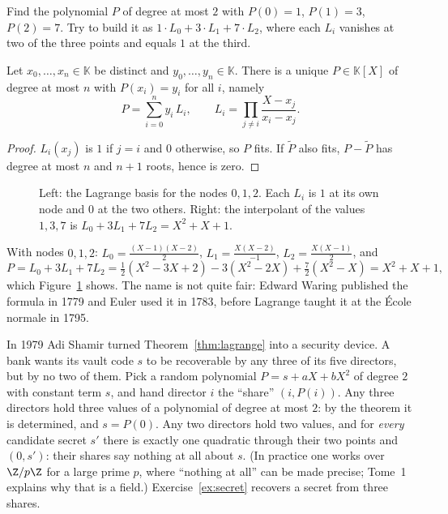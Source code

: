 \begin{think}
Find the polynomial $P$ of degree at most $2$ with $P(0)=1$, $P(1)=3$, $P(2)=7$. Try to build it as $1\cdot L_0+3\cdot L_1+7\cdot L_2$, where each $L_i$ vanishes at two of the three points and equals $1$ at the third.
\end{think}

\begin{theorem}[Lagrange]\label{thm:lagrange}
Let $x_0,\dots,x_n\in\mathbb K$ be distinct and $y_0,\dots,y_n\in\mathbb K$. There is a unique $P\in\mathbb K[X]$ of degree at most $n$ with $P(x_i)=y_i$ for all $i$, namely
\[
P=\sum_{i=0}^ny_i\,L_i,\qquad L_i=\prod_{j\ne i}\frac{X-x_j}{x_i-x_j}.
\]
\end{theorem}
\begin{proof}
$L_i(x_j)$ is $1$ if $j=i$ and $0$ otherwise, so $P$ fits. If $\tilde P$ also fits, $P-\tilde P$ has degree at most $n$ and $n+1$ roots, hence is zero.
\end{proof}

\begin{figure}[ht]
\centering
{}
\caption{Left: the Lagrange basis for the nodes $0,1,2$. Each $L_i$ is $1$ at its own node and $0$ at the two others. Right: the interpolant of the values $1,3,7$ is $L_0+3L_1+7L_2=X^2+X+1$.}
\label{fig:lagrange}
\end{figure}

\begin{examplex}
With nodes $0,1,2$: $L_0=\frac{(X-1)(X-2)}2$, $L_1=\frac{X(X-2)}{-1}$, $L_2=\frac{X(X-1)}2$, and
\[
P=L_0+3L_1+7L_2=\tfrac12(X^2-3X+2)-3(X^2-2X)+\tfrac72(X^2-X)=X^2+X+1,
\]
which Figure~\ref{fig:lagrange} shows. The name is not quite fair: Edward Waring published the formula in 1779 and Euler used it in 1783, before
Lagrange taught it at the \'Ecole normale in 1795.
\end{examplex}

\begin{examplex}
In 1979 Adi Shamir turned Theorem~\ref{thm:lagrange} into a security device. A bank wants its vault code $s$ to be recoverable by any three of its
five directors, but by no two of them. Pick a random polynomial $P=s+aX+bX^2$ of degree $2$ with constant term $s$, and hand director $i$ the
``share'' $(i,P(i))$. Any three directors hold three values of a polynomial of degree at most $2$: by the theorem it is determined, and $s=P(0)$.
Any two directors hold two values, and for \emph{every} candidate secret $s'$ there is exactly one quadratic through their two points and $(0,s')$: their
shares say nothing at all about $s$. (In practice one works over $\Z/p\Z$ for a large prime $p$, where ``nothing at all'' can be made precise;
Tome~1 explains why that is a field.) Exercise~\ref{ex:secret} recovers a secret from three shares.
\end{examplex}

